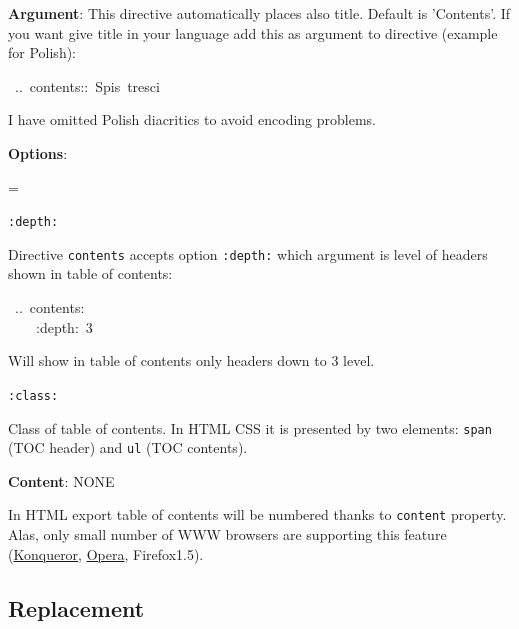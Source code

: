 \documentclass[12pt]{article}
\newenvironment{deflist}[1]{%
\begin{list}{}
{\renewcommand{\makelabel}[1]{\textbf{##1}\hfill}
\settowidth{\labelwidth}{\textbf{#1}}
\leftmargin=\labelwidth
\advance \leftmargin\labelsep}}
{\end{list}}
\newcommand{\sups}[1]{\raisebox{0.7ex}{\footnotesize #1}}
\begin{document}
\begin{itemize}
\item
\textbf{Argument}: This directive automatically places also title. Default is
'Contents'. If you want give title in your language add this as argument to
directive (example for Polish):

\begin{ttfamily}\begin{flushleft}
\mbox{~..~contents::~Spis~tresci}\\
\end{flushleft}\end{ttfamily}

 I have omitted Polish diacritics to avoid encoding problems.

\item
\textbf{Options}:

 \begin{deflist}{iii}

\item[ \texttt{:depth:}]

Directive \texttt{contents} accepts option \texttt{:depth:} which
argument is level of headers shown in table of contents:

\begin{ttfamily}\begin{flushleft}
\mbox{~..~contents:}\\
\mbox{~~~~:depth:~3}\\
\end{flushleft}\end{ttfamily}

 Will show in table of contents only headers down to 3\sups{rd}
 level.

\item[ \texttt{:class:}]

Class of table of contents. In HTML CSS it is presented by two
elements: \texttt{span} (TOC header) and \texttt{ul} (TOC contents).
\end{deflist}

\item
\textbf{Content}: NONE
\end{itemize}

In HTML export table of contents will be numbered thanks to \texttt{content}
property. Alas, only small number of WWW browsers are supporting this
feature (\href{http://www.kde.org}{Konqueror}, \href{http://www.opera.com}{Opera}, Firefox1.5).

\hypertarget{lreplacement}{}
\subsection{Replacement}
\end{document}
